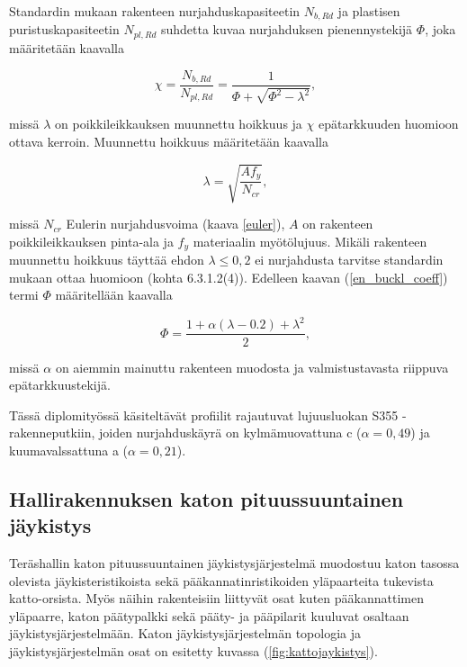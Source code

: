 \documentclass[12pt]{article}
\newenvironment{content}{\pagenumbering{arabic}}{}
\begin{document}
\begin{content}
Standardin mukaan rakenteen nurjahduskapasiteetin $N_{b,Rd}$ ja plastisen puristuskapasiteetin $N_{pl,Rd}$ suhdetta kuvaa nurjahduksen pienennystekijä $\Phi$, joka määritetään kaavalla

\begin{equation}
\label{en_buckl_coeff}
\chi = \frac{N_{b,Rd}}{N_{pl,Rd}} =\frac{1}{\Phi + \sqrt{\Phi^2-\lambda^2}},
\end{equation}

missä $\lambda$ on poikkileikkauksen muunnettu hoikkuus ja $\chi$ epätarkkuuden huomioon ottava kerroin. Muunnettu hoikkuus määritetään kaavalla 

\begin{equation}
\label{hoikkuus}
\lambda = \sqrt{\frac{A f_y}{N_{cr}}},
\end{equation}

missä $N_{cr}$ Eulerin nurjahdusvoima (kaava \ref{euler}), $A$ on rakenteen poikkileikkauksen pinta-ala ja $f_y$ materiaalin myötölujuus. Mikäli rakenteen muunnettu hoikkuus täyttää ehdon $\lambda \leq 0,2$ ei nurjahdusta tarvitse standardin mukaan ottaa huomioon (kohta 6.3.1.2(4)). Edelleen kaavan (\ref{en_buckl_coeff}) termi $\Phi$ määritellään kaavalla

\begin{equation}
\label{phi}
\Phi = \frac{1+\alpha (\lambda-0.2)+\lambda^2}{2},
\end{equation}   

missä $\alpha$ on aiemmin mainuttu rakenteen muodosta ja valmistustavasta riippuva epätarkkuustekijä. 

Tässä diplomityössä käsiteltävät profiilit rajautuvat lujuusluokan S355 -rakenneputkiin, joiden nurjahduskäyrä on kylmämuovattuna c ($\alpha = 0,49$) ja kuumavalssattuna a ($\alpha = 0,21$).  



\subsection{Hallirakennuksen katon pituussuuntainen jäykistys}

Teräshallin katon pituussuuntainen jäykistysjärjestelmä muodostuu katon tasossa olevista jäykisteristikoista sekä pääkannatinristikoiden yläpaarteita tukevista katto-orsista. Myös näihin rakenteisiin liittyvät osat kuten pääkannattimen yläpaarre, katon päätypalkki sekä pääty- ja pääpilarit kuuluvat osaltaan jäykistysjärjestelmään. Katon jäykistysjärjestelmän topologia ja jäykistysjärjestelmän osat on esitetty kuvassa (\ref{fig:kattojaykistys}).


\end{content}
\end{document}
